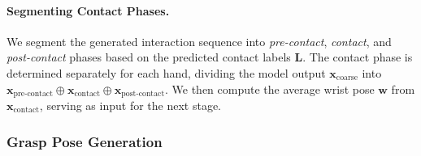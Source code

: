 \vspace{-3mm}
\paragraph{Segmenting Contact Phases.} 
We segment the generated interaction sequence into \textit{pre-contact}, \textit{contact}, and \textit{post-contact} phases based on the predicted contact labels $\bm{L}$.  
The contact phase is determined separately for each hand, dividing the model output $\bm{x}_\text{coarse}$ into $\bm{x}_\text{pre-contact} \oplus \bm{x}_\text{contact} \oplus \bm{x}_\text{post-contact}$.
We then compute the average wrist pose $\bm{w}$ from $\bm{x}_\text{contact}$, serving as input for the next stage. 

\subsubsection{Grasp Pose Generation}
\label{subsubsec:grasp_pose}


